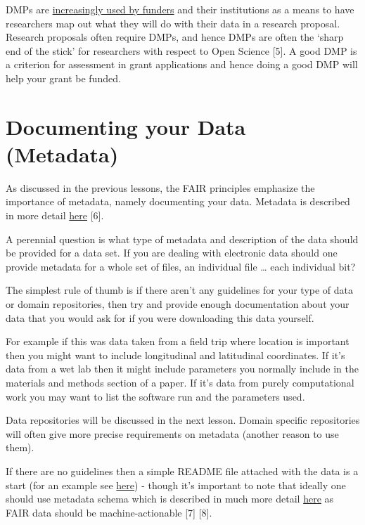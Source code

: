 \documentclass[
  letterpaper,
  DIV=11,
  numbers=noendperiod]{scrreport}
\begin{document}
DMPs are \href{https://dmptool.org/public_templates}{increasingly used
by funders} and their institutions as a means to have researchers map
out what they will do with their data in a research proposal. Research
proposals often require DMPs, and hence DMPs are often the `sharp end of
the stick' for researchers with respect to Open Science {[}5{]}. A good
DMP is a criterion for assessment in grant applications and hence doing
a good DMP will help your grant be funded.

\hypertarget{documenting-your-data-metadata}{%
\section{Documenting your Data
(Metadata)}\label{documenting-your-data-metadata}}

As discussed in the previous lessons, the FAIR principles emphasize the
importance of metadata, namely documenting your data. Metadata is
described in more detail
\href{https://the-turing-way.netlify.app/reproducible-research/rdm/rdm-metadata.html}{here}
{[}6{]}.

A perennial question is what type of metadata and description of the
data should be provided for a data set. If you are dealing with
electronic data should one provide metadata for a whole set of files, an
individual file \ldots{} each individual bit?

The simplest rule of thumb is if there aren't any guidelines for your
type of data or domain repositories, then try and provide enough
documentation about your data that you would ask for if you were
downloading this data yourself.

For example if this was data taken from a field trip where location is
important then you might want to include longitudinal and latitudinal
coordinates. If it's data from a wet lab then it might include
parameters you normally include in the materials and methods section of
a paper. If it's data from purely computational work you may want to
list the software run and the parameters used.

Data repositories will be discussed in the next lesson. Domain specific
repositories will often give more precise requirements on metadata
(another reason to use them).

If there are no guidelines then a simple README file attached with the
data is a start (for an example see
\href{https://cornell.app.box.com/v/ReadmeTemplate}{here}) - though it's
important to note that ideally one should use metadata schema which is
described in much more detail
\href{https://www.dcc.ac.uk/guidance/standards}{here} as FAIR data
should be machine-actionable {[}7{]} {[}8{]}.
\end{document}
